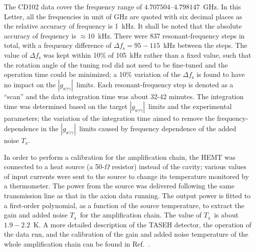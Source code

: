 \documentclass[%
 reprint,prl, %
 amsmath,amssymb,
 aps,
]{revtex4-2}
\newcommand{\gagg}{\ensuremath{\left|g_{a\gamma\gamma}\right|}}
\newcommand{\ta}{\ensuremath{T_\text{a}}}
\newcommand{\flo}{\ensuremath{4.707504}}
\newcommand{\fhi}{\ensuremath{4.798147}}
\newcommand{\noise}{\ensuremath{1.9 - 2.2}}
\begin{document}
The CD102 data cover the frequency range of \flo--\fhi~GHz. In this Letter, 
all the frequencies in unit of GHz are quoted with six decimal places as the 
relative accuracy of frequency is 1~kHz. It shall be noted that the 
absolute accuracy of frequency is $\approx 10$~kHz.  
There were 837 resonant-frequency steps in total, with a frequency difference 
of $\Delta f_\text{s}=95-115$~kHz between the steps. The value of 
$\Delta f_\text{s}$ was kept within 10\% of 105~kHz rather than 
a fixed value, such that the rotation angle of the tuning rod did not need to 
be fine-tuned and the operation time could be minimized; a 10\% variation of 
the $\Delta f_\text{s}$ is found to have no impact on the \gagg\ limits. 
Each resonant-frequency step is denoted as a ``scan'' 
and the data integration time was about 32-42 minutes. The integration 
time was determined based on the target \gagg\ limits and the experimental 
parameters; the variation of the integration 
time aimed to remove the frequency-dependence in the \gagg\ limits caused by   
frequency dependence of the added noise \ta. 

In order to perform a calibration for the amplification chain, 
the HEMT was connected to a heat source (a 50-$\Omega$ resistor) instead of
the cavity;
various values of input currents were sent to the source to change its
temperature monitored by a thermometer. The power from the source
was delivered following the same transmission line as that in the axion
data running. 
The output power is fitted to a first-order polynomial, as a function of
the source temperature, to extract the gain and added noise \ta\ for the
amplification chain. The value of \ta\ is about \noise~K. 
%
A more detailed description of the TASEH detector, the operation of the 
data run, and the calibration of the gain and added noise temperature of the 
whole amplification chain can be found in Ref.~\cite{TASEHInstrumentation}. 




\end{document}
